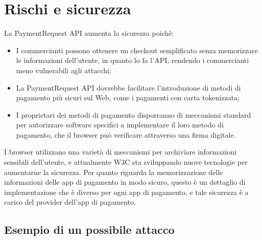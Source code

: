 \documentclass[11pt ,a4paper , twoside , openright ]{article}
\begin{document}
	\section{Rischi e sicurezza}
	La PaymentRequest API aumenta la sicurezza poichè:
	\begin{itemize}
		\item I commercianti possono ottenere un checkout semplificato senza memorizzare le informazioni dell'utente, in quanto lo fa l'API, rendendo i commercianti meno vulnerabili agli attacchi;
		\item La PaymentRequest API dovrebbe facilitare l'introduzione di metodi di pagamento più sicuri sul Web, come i pagamenti con carta tokenizzata;
		\item I proprietari dei metodi di pagamento disporranno di meccanismi standard per autorizzare software specifici a implementare il loro metodo di pagamento, che il browser può verificare attraverso una firma digitale.
	\end{itemize}
	I browser utilizzano una varietà di meccanismi per archiviare informazioni sensibili dell'utente, e attualmente W3C sta sviluppando nuove tecnologie per aumentarne la sicurezza.
	Per quanto riguarda la memorizzazione delle informazioni delle app di pagamento in modo sicuro, questo è un dettaglio di implementazione che è diverso per ogni app di pagamento, e tale sicurezza è a carico del provider dell'app di pagamento.
	
	\subsection{Esempio di un possibile attacco}
\end{document}
